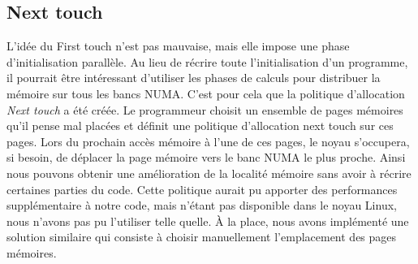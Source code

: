 \subsection{Next touch}
\label{sec:next_touch}
L'idée du First touch n'est pas mauvaise, mais elle impose une phase d'initialisation parallèle.
%
Au lieu de récrire toute l'initialisation d'un programme, il pourrait être intéressant d'utiliser les phases de calculs pour distribuer la mémoire sur tous les bancs NUMA.
%
C'est pour cela que la politique d'allocation {\em Next touch} a été créée.
%
Le programmeur choisit un ensemble de pages mémoires qu'il pense mal placées et définit une politique d'allocation next touch sur ces pages.
%
Lors du prochain accès mémoire à l'une de ces pages, le noyau s'occupera, si besoin, de déplacer la page mémoire vers le banc NUMA le plus proche.
%
Ainsi nous pouvons obtenir une amélioration de la localité mémoire sans avoir à récrire certaines parties du code.
%
Cette politique aurait pu apporter des performances supplémentaire à notre code, mais n'étant pas disponible dans le noyau Linux, nous n'avons pas pu l'utiliser telle quelle.
%
\`A la place, nous avons implémenté une solution similaire qui consiste à choisir manuellement l'emplacement des pages mémoires.
